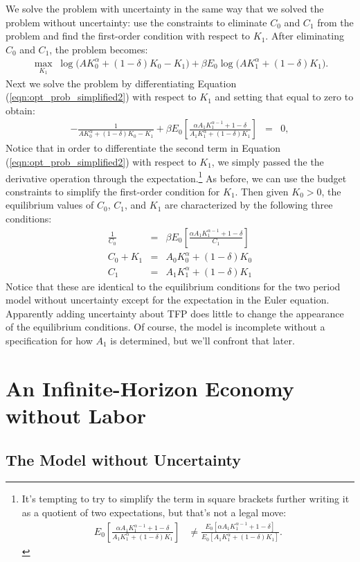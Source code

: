 \documentclass[12pt,fleqn]{article}
\newcommand{\D}{\displaystyle}
\newcommand{\EE}{\begin{eqnarray}}
\newcommand{\FF}{\end{eqnarray}}
\begin{document}
We solve the problem with uncertainty in the same way that we solved the problem without uncertainty: use the constraints to eliminate $C_0$ and $C_1$ from the problem and find the first-order condition with respect to $K_1$. After eliminating $C_0$ and $C_1$, the problem becomes:
	\EE
	\max_{K_1} \; \log \Big( A K_0^{\alpha}  + (1-\delta)K_0 - K_1 \Big) + \beta E_0 \log \Big( A K_1^{\alpha}  + (1-\delta)K_1 \Big). \label{eqn:opt_prob_simplified2}
	\FF
Next we solve the problem by differentiating Equation (\ref{eqn:opt_prob_simplified2}) with respect to $K_1$ and setting that equal to zero to obtain:
	\EE
	 - \frac{1}{A K_0^{\alpha}  +  (1-\delta)K_0 - K_1}  +  \beta E_0 \left[\frac{ \alpha A_1K_1^{\alpha-1} + 1-\delta}{A_1 K_1^{\alpha}  + (1-\delta)K_1}\right] & = & 0 \label{eqn:two_per_stoch_k1_foc},
	\FF
Notice that in order to differentiate the second term in Equation (\ref{eqn:opt_prob_simplified2}) with respect to $K_1$, we simply passed the the derivative operation through the expectation.\footnote{It's tempting to try to simplify the term in square brackets further writing it as a quotient of two expectations, but that's not a legal move:
	\EE
	E_0 \left[  \frac{\alpha A_1 K_1^{\alpha-1}  + 1-\delta}{ A_1 K_1^{\alpha}  + (1-\delta)K_1}\right] & \ne   \D   \frac{\D E_0 \left[\alpha A_1 K_1^{\alpha-1}  + 1-\delta\right]}{ \D E_0 \left[ A_1 K_1^{\alpha}  + (1-\delta)K_1\right] }.
	\FF}
As before, we can use the budget constraints to simplify the first-order condition for $K_1$. Then given $K_0>0$, the equilibrium values of $C_0$, $C_1$, and $K_1$ are characterized by the following three conditions:
	\EE
	\frac{1}{C_0} & = &  \beta E_0 \left[ \frac{\alpha A_1K_1^{\alpha-1} + 1-\delta}{C_1}\right]\\
	C_0 + K_1 & = &  A_0 K_0^{\alpha}  + (1-\delta)K_0\\
	C_1 & = &  A_1 K_1^{\alpha}  + (1-\delta)K_1
	\FF
Notice that these are identical to the equilibrium conditions for the two period model without uncertainty except for the expectation in the Euler equation. Apparently adding uncertainty about TFP does little to change the appearance of the equilibrium conditions. Of course, the model is incomplete without a specification for how $A_1$ is determined, but we'll confront that later.

\section{An Infinite-Horizon Economy without Labor}

\subsection{The Model without Uncertainty}
\end{document}
